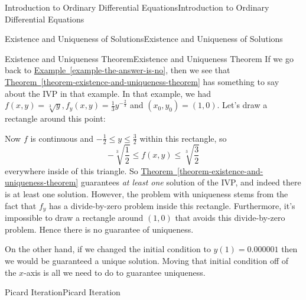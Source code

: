 \documentclass[10pt,]{book}
\numberwithin{equation}{section}
\begin{document}
\begin{chapterptx}{Introduction to Ordinary Differential Equations}{}{Introduction to Ordinary Differential Equations}{}{}
\begin{sectionptx}{Existence and Uniqueness of Solutions}{}{Existence and Uniqueness of Solutions}{}{}
\begin{subsectionptx}{Existence and Uniqueness Theorem}{}{Existence and Uniqueness Theorem}{}{}
\hypertarget{p-97}{}%
If we go back to \hyperref[example-the-answer-is-no]{Example~\ref{example-the-answer-is-no}}, then we see that \hyperref[theorem-existence-and-uniqueness-theorem]{Theorem~\ref{theorem-existence-and-uniqueness-theorem}} has something to say about the IVP in that example. In that example, we had \(f(x,y) = \sqrt[3]{y}, f_{y}(x,y) = \frac{1}{3}y^{-\frac{2}{3}}\) and \((x_{0},y_{0}) = (1,0)\). Let's draw a rectangle around this point: \begin{figure}
\centering
{
}
\end{figure}
%
\par
\hypertarget{p-98}{}%
Now \(f\) is continuous and \(-\frac{1}{2}\leq y\leq\frac{3}{2}\) within this rectangle, so%
\begin{equation*}
-\sqrt[3]{\frac{1}{2}}\leq f(x,y)\leq\sqrt[3]{\frac{3}{2}}
\end{equation*}
everywhere inside of this triangle. So \hyperref[theorem-existence-and-uniqueness-theorem]{Theorem~\ref{theorem-existence-and-uniqueness-theorem}} guarantees \emph{at least one} solution of the IVP, and indeed there is at least one solution. However, the problem with uniqueness stems from the fact that \(f_{y}\) has a divide-by-zero problem inside this rectangle. Furthermore, it's impossible to draw a rectangle around \((1,0)\) that avoids this divide-by-zero problem. Hence there is no guarantee of uniqueness.%
\par
\hypertarget{p-99}{}%
On the other hand, if we changed the initial condition to \(y(1) = 0.000001\) then we would be guaranteed a unique solution. Moving that initial condition off of the \(x\)-axis is all we need to do to guarantee uniqueness.%
\end{subsectionptx}
%
%
\typeout{************************************************}
\typeout{************************************************}
%
\begin{subsectionptx}{Picard Iteration}{}{Picard Iteration}{}{}\label{subsection-picard-iteration}

\end{subsectionptx}
\end{sectionptx}
\end{chapterptx}
\end{document}
